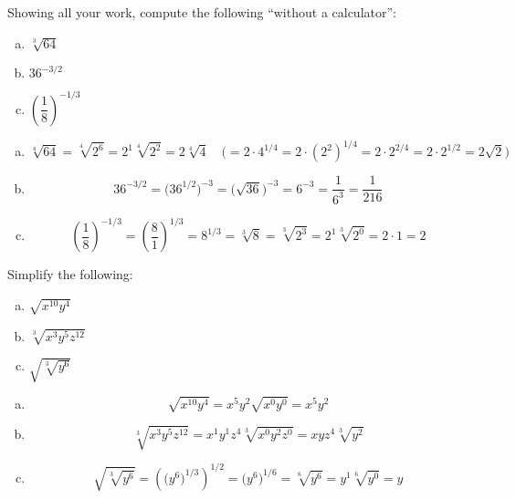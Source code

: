 \documentclass[11pt,letterpaper]{article}
\begin{document}

 Showing all your work, compute the following ``without a calculator'': 
	\begin{enumerate}[(a)]
	\item $\sqrt[3]{64}$
	\item $36^{-3/2}$
	\item $\left( \dfrac{1}{8} \right)^{-1/3}$
	\end{enumerate} \pspace

\sol 
\begin{enumerate}[(a)]
\item 
	\[
	\sqrt[4]{64}= \sqrt[4]{2^6}= 2^1 \sqrt[4]{2^2}= 2 \sqrt[4]{4} \quad \big(= 2 \cdot 4^{1/4}= 2 \cdot (2^2)^{1/4}= 2 \cdot 2^{2/4}= 2 \cdot 2^{1/2}= 2 \sqrt{2} \big)
	\] \pspace

\item 
	\[
	36^{-3/2}= \big(36^{1/2} \big)^{-3}= \big( \sqrt{36} \big)^{-3}= 6^{-3}= \dfrac{1}{6^3}= \dfrac{1}{216}
	\] \pspace

\item 
	\[
	\left( \dfrac{1}{8} \right)^{-1/3}= \left( \dfrac{8}{1} \right)^{1/3}= 8^{1/3}= \sqrt[3]{8}= \sqrt[3]{2^3}= 2^1 \sqrt[3]{2^0}= 2 \cdot 1= 2
	\]
\end{enumerate}



\newpage



 Simplify the following:
	\begin{enumerate}[(a)]
	\item $\sqrt{x^{10} y^4}$
	\item $\sqrt[3]{x^3 y^5 z^{12}}$
	\item $\sqrt{\sqrt[3]{y^6}}$
	\end{enumerate} \pspace

\sol 
\begin{enumerate}[(a)]
\item 
	\[
	\sqrt{x^{10} y^4}= x^5 y^2 \sqrt{x^0 y^0}= x^5 y^2
	\] \pspace

\item 
	\[
	\sqrt[3]{x^3 y^5 z^{12}}= x^1 y^1 z^4 \sqrt[3]{x^0 y^2 z^0}= x y z^4 \sqrt[3]{y^2}
	\] \pspace

\item 
	\[
	\sqrt{\sqrt[3]{y^6}}= \left( \big( y^6 \big)^{1/3} \right)^{1/2}= \big(y^6 \big)^{1/6}= \sqrt[6]{y^6}= y^1 \sqrt[6]{y^0}= y
	\]
\end{enumerate}
\end{document}
